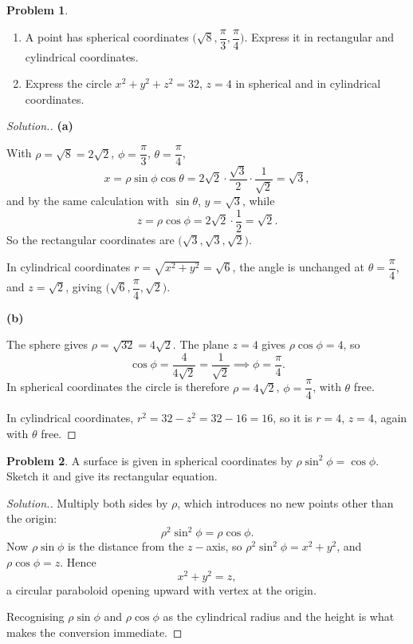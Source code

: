 \documentclass[11pt,a4paper]{article}
\theoremstyle{definition}
\newtheorem{problemx}{Problem}[subsection]
\newenvironment{problem}{\begin{problemx}}{\end{problemx}}
\newenvironment{solution}
  {\renewcommand{\qedsymbol}{}\begin{proof}[\textit{Solution}.]}
  {\end{proof}}
\newcommand{\subhead}[1]{%
  \par\medskip\noindent\textbf{#1}\par\nobreak\smallskip}
\begin{document}
\begin{problem}
\begin{enumerate}
\item[(a)] A point has spherical coordinates
$\Big(\sqrt8, \dfrac{\pi}{3}, \dfrac{\pi}{4}\Big)$. Express it in rectangular
and cylindrical coordinates.
\item[(b)] Express the circle $x^2+y^2+z^2 = 32$, $z = 4$ in spherical and in
cylindrical coordinates.
\end{enumerate}
\end{problem}
\begin{solution}
\subhead{(a)}
With $\rho = \sqrt8 = 2\sqrt2$, $\phi = \dfrac{\pi}{3}$,
$\theta = \dfrac{\pi}{4}$,
$$x = \rho\sin\phi\cos\theta = 2\sqrt2\cdot\frac{\sqrt3}{2}\cdot\frac{1}{\sqrt2}
= \sqrt3 ,$$
and by the same calculation with $\sin\theta$, $y = \sqrt3$, while
$$z = \rho\cos\phi = 2\sqrt2\cdot\frac12 = \sqrt2 .$$
So the rectangular coordinates are $\big(\sqrt3, \sqrt3, \sqrt2\big)$.

In cylindrical coordinates $r = \sqrt{x^2+y^2} = \sqrt6$, the angle is
unchanged at $\theta = \dfrac{\pi}{4}$, and $z = \sqrt2$, giving
$\Big(\sqrt6, \dfrac{\pi}{4}, \sqrt2\Big)$.

\subhead{(b)}
The sphere gives $\rho = \sqrt{32} = 4\sqrt2$. The plane $z=4$ gives
$\rho\cos\phi = 4$, so
$$\cos\phi = \frac{4}{4\sqrt2} = \frac{1}{\sqrt2}\implies \phi = \frac{\pi}{4}.$$
In spherical coordinates the circle is therefore
$\rho = 4\sqrt2$, $\phi = \dfrac{\pi}{4}$, with $\theta$ free.

In cylindrical coordinates, $r^2 = 32-z^2 = 32-16 = 16$, so it is
$r = 4$, $z = 4$, again with $\theta$ free.
\end{solution}

\begin{problem}
A surface is given in spherical coordinates by $\rho\sin^2\phi = \cos\phi$.
Sketch it and give its rectangular equation.
\end{problem}
\begin{solution}
Multiply both sides by $\rho$, which introduces no new points other than the
origin:
$$\rho^2\sin^2\phi = \rho\cos\phi .$$
Now $\rho\sin\phi$ is the distance from the $z-$axis, so
$\rho^2\sin^2\phi = x^2+y^2$, and $\rho\cos\phi = z$. Hence
$$x^2+y^2 = z ,$$
a circular paraboloid opening upward with vertex at the origin.

Recognising $\rho\sin\phi$ and $\rho\cos\phi$ as the cylindrical radius and the
height is what makes the conversion immediate.
\end{solution}
\end{document}
